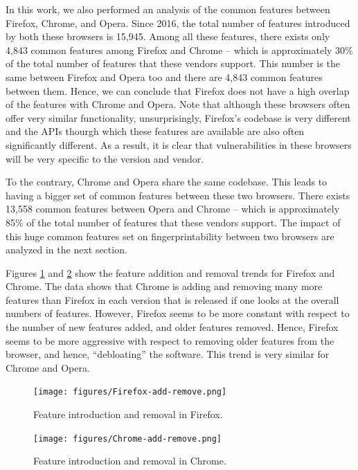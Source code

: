   In this work, we also performed an analysis of the common features
  between Firefox, Chrome, and Opera. Since 2016, the total number of features
  introduced by both these browsers is 15,945. Among all these features,
  there exists only 4,843 common features among Firefox and Chrome -- which is
  approximately 30\% of the total number of features that these
  vendors support. This number is the same between Firefox and Opera too and
  there are 4,843 common features between them. Hence, we can conclude that Firefox
  does not have a high overlap of the features with Chrome and Opera. Note that
  although these browsers often offer very similar functionality,
  unsurprisingly, Firefox's codebase is very different and the APIs
  thourgh which these features are available are also often
  significantly different. As a result, it is clear that
  vulnerabilities in these browsers will be very specific to the
  version and vendor.

  To the contrary, Chrome and Opera share the same codebase. This leads to having
  a bigger set of common features between these two browsers. There exists 13,558 
  common features between Opera and Chrome -- which is approximately 85\% of the total
  number of features that these vendors support. The impact of this huge common features set
  on fingerprintability between two browsers are analyzed in the next section.

  Figures \ref{fig:ffaddremove} and \ref{fig:chaddremove} show the
  feature addition and removal trends for Firefox and Chrome. The data
  shows that Chrome is adding and removing many more features than
  Firefox in each version that is released if one looks at the overall
  numbers of features. However, Firefox seems to be more constant with
  respect to the number of new features added, and older features
  removed. Hence, Firefox seems to be more aggressive with respect to
  removing older features from the browser, and hence, ``debloating''
  the software. This trend is very similar for Chrome and Opera.

\begin{figure}[ht]
    \centering
    \texttt{[image: figures/Firefox-add-remove.png]}
    \caption{Feature introduction and removal in Firefox.}
    \label{fig:ffaddremove}
\end{figure}

\begin{figure}[ht]
    \centering
    \texttt{[image: figures/Chrome-add-remove.png]}
    \caption{Feature introduction and removal in Chrome.}
    \label{fig:chaddremove}
\end{figure}

